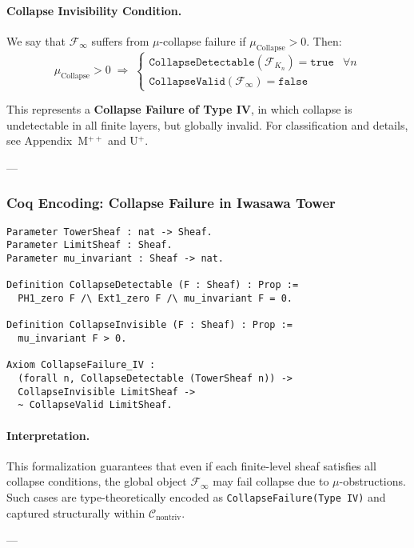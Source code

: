 \documentclass[11pt]{article}
\begin{document}
\paragraph{Collapse Invisibility Condition.}
We say that $\mathcal{F}_\infty$ suffers from $\mu$-collapse failure if $\mu_{\mathrm{Collapse}} > 0$. Then:
\[
\mu_{\mathrm{Collapse}} > 0 \;\Rightarrow\;
\begin{cases}
\texttt{CollapseDetectable}(\mathcal{F}_{K_n}) = \texttt{true} & \forall n \\
\texttt{CollapseValid}(\mathcal{F}_\infty) = \texttt{false} &
\end{cases}
\]

This represents a \textbf{Collapse Failure of Type IV}, in which collapse is undetectable in all finite layers, but globally invalid. For classification and details, see Appendix~M$^{++}$ and U$^+$.

---

\subsubsection*{Coq Encoding: Collapse Failure in Iwasawa Tower}

\begin{lstlisting}[language=Coq]
Parameter TowerSheaf : nat -> Sheaf.
Parameter LimitSheaf : Sheaf.
Parameter mu_invariant : Sheaf -> nat.

Definition CollapseDetectable (F : Sheaf) : Prop :=
  PH1_zero F /\ Ext1_zero F /\ mu_invariant F = 0.

Definition CollapseInvisible (F : Sheaf) : Prop :=
  mu_invariant F > 0.

Axiom CollapseFailure_IV :
  (forall n, CollapseDetectable (TowerSheaf n)) ->
  CollapseInvisible LimitSheaf ->
  ~ CollapseValid LimitSheaf.
\end{lstlisting}

\paragraph{Interpretation.}
This formalization guarantees that even if each finite-level sheaf satisfies all collapse conditions, the global object $\mathcal{F}_\infty$ may fail collapse due to $\mu$-obstructions. Such cases are type-theoretically encoded as \texttt{CollapseFailure(Type~IV)} and captured structurally within $\mathcal{C}_{\mathrm{nontriv}}$.

---
\end{document}
